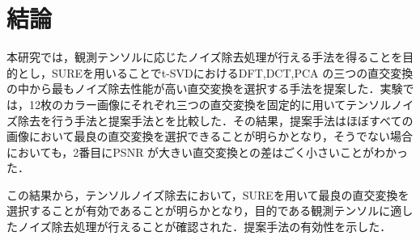 \chapter{結論}
本研究では，観測テンソルに応じたノイズ除去処理が行える手法を得ることを目的とし，SUREを用いることでt-SVDにおけるDFT,DCT,PCA
の三つの直交変換の中から最もノイズ除去性能が高い直交変換を選択する手法を提案した．実験では，12枚のカラー画像にそれぞれ三つの直交変換を固定的に用いてテンソルノイズ除去を行う手法と提案手法とを比較した．その結果，提案手法はほぼすべての画像において最良の直交変換を選択できることが明らかとなり，そうでない場合においても，2番目にPSNR が大きい直交変換との差はごく小さいことがわかった．

この結果から，テンソルノイズ除去において，SUREを用いて最良の直交変換を選択することが有効であることが明らかとなり，目的である観測テンソルに適したノイズ除去処理が行えることが確認された．提案手法の有効性を示した．